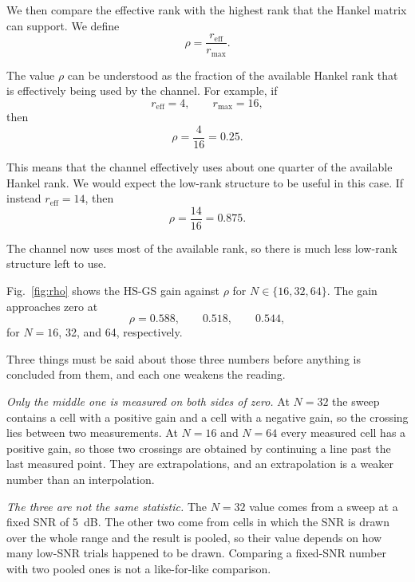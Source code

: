 \documentclass[journal]{IEEEtran}
\newcommand{\rmax}{r_{\mathrm{max}}}
\newcommand{\reff}{r_{\mathrm{eff}}}
\begin{document}
We then compare the effective rank with the highest rank that the Hankel matrix
can support. We define
\begin{equation}
\rho=\frac{\reff}{\rmax}.
\end{equation}

The value $\rho$ can be understood as the fraction of the available Hankel rank
that is effectively being used by the channel. For example, if
\begin{equation}
\reff=4,\qquad \rmax=16,
\end{equation}
then
\begin{equation}
\rho=\frac{4}{16}=0.25.
\end{equation}

This means that the channel effectively uses about one quarter of the available
Hankel rank. We would expect the low-rank structure to be useful in this case.
If instead $\reff=14$, then
\begin{equation}
\rho=\frac{14}{16}=0.875.
\end{equation}

The channel now uses most of the available rank, so there is much less low-rank
structure left to use.

Fig.~\ref{fig:rho} shows the HS-GS gain against $\rho$ for $N\in\{16,32,64\}$.
The gain approaches zero at
\begin{equation}
\rho=0.588,\qquad 0.518,\qquad 0.544,
\end{equation}
for $N=16$, 32, and 64, respectively.

Three things must be said about those three numbers before anything is
concluded from them, and each one weakens the reading.

\emph{Only the middle one is measured on both sides of zero.} At $N=32$ the
sweep contains a cell with a positive gain and a cell with a negative gain, so
the crossing lies between two measurements. At $N=16$ and $N=64$ every measured
cell has a positive gain, so those two crossings are obtained by continuing a
line past the last measured point. They are extrapolations, and an
extrapolation is a weaker number than an interpolation.

\emph{The three are not the same statistic.} The $N=32$ value comes from a
sweep at a fixed SNR of 5~dB. The other two come from cells in which the SNR is
drawn over the whole range and the result is pooled, so their value depends on
how many low-SNR trials happened to be drawn. Comparing a fixed-SNR number with
two pooled ones is not a like-for-like comparison.
\end{document}
